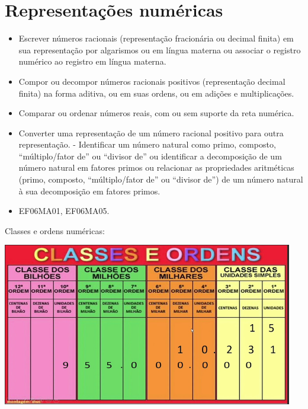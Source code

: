 


\chapter{Representações numéricas}




\begin{itemize}
\item
  Escrever números racionais (representação fracionária ou decimal
  finita) em sua representação por algarismos ou em língua materna ou
  associar o registro numérico ao registro em língua materna.
\item
  Compor ou decompor números racionais positivos (representação decimal
  finita) na forma aditiva, ou em suas ordens, ou em adições e
  multiplicações.
\item
  Comparar ou ordenar números reais, com ou sem suporte da reta
  numérica.
\item
  Converter uma representação de um número racional positivo para outra
  representação. - Identificar um número natural como primo, composto,
  ``múltiplo/fator de'' ou ``divisor de'' ou identificar a decomposição
  de um número natural em fatores primos ou relacionar as propriedades
  aritméticas (primo, composto, ``múltiplo/fator de'' ou ``divisor de'')
  de um número natural à sua decomposição em fatores primos.
\end{itemize}


\begin{itemize} 
\item  EF06MA01, EF06MA05.
\end{itemize}

Classes e ordens numéricas:


\includegraphics[width=5in,height=2.80208in]{./imgSAEB_6_MAT/media/image1.png}

